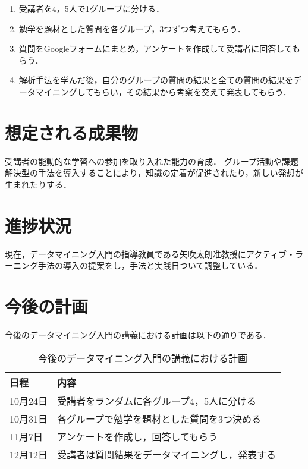 \documentclass[uplatex,twocolumn,dvipdfmx]{jsarticle}
\begin{document}
\begin{enumerate}

\item 受講者を4，5人で1グループに分ける．
\item 勉学を題材とした質問を各グループ，3つずつ考えてもらう．
\item 質問をGoogleフォームにまとめ，アンケートを作成して受講者に回答してもらう．
\item 解析手法を学んだ後，自分のグループの質問の結果と全ての質問の結果をデータマイニングしてもらい，その結果から考察を交えて発表してもらう．

\end{enumerate}


\section{想定される成果物}

受講者の能動的な学習への参加を取り入れた能力の育成．
グループ活動や課題解決型の手法を導入することにより，知識の定着が促進されたり，新しい発想が生まれたりする．


\section{進捗状況}

現在，データマイニング入門の指導教員である矢吹太朗准教授にアクティブ・ラーニング手法の導入の提案をし，手法と実践日ついて調整している．



\section{今後の計画}

今後のデータマイニング入門の講義における計画は以下の通りである．
\begin{table}[hbtp]
  \caption{今後のデータマイニング入門の講義における計画}
  \label{table:data_type}
  \centering
  \begin{tabular}{|l|l|}
    \hline
    日程 & 内容  \\ \hline \hline
    10月24日 & 受講者をランダムに各グループ4，5人に分ける \\
    10月31日 & 各グループで勉学を題材とした質問を3つ決める \\
    11月7日 & アンケートを作成し，回答してもらう \\
    12月12日 & 受講者は質問結果をデータマイニングし，発表する \\
 \hline
  \end{tabular}
\end{table}


\end{document}
